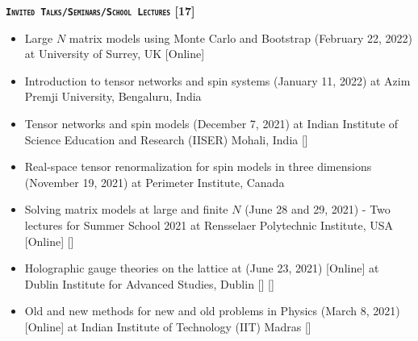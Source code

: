 \vspace{2mm} 
\textcolor{alizarin}{\textbf{\textsc{\fontsize{10}{38} \bfseries \texttt{Invited Talks/Seminars/School Lectures} [17]}}}

\begin{itemize}

\item Large $N$ matrix models using Monte Carlo and Bootstrap
 (February 22, 2022) at University of Surrey, UK [Online]  \vspace{1mm} 
 \item Introduction to tensor networks and spin systems 
 (January 11, 2022) at Azim Premji University, Bengaluru, India  \vspace{1mm} 
 \item Tensor networks and spin models 
 (December 7, 2021) at Indian Institute of Science Education and Research (IISER) Mohali, India 
 [\texttt{\textbf{}}]  \vspace{1mm} 
  \item Real-space tensor renormalization for spin models in three dimensions 
 (November 19, 2021) at Perimeter Institute, Canada \vspace{1mm}  
 \item Solving matrix models at large and finite $N$ (June 28 and 29, 2021) - Two lectures for 
Summer School 2021 at Rensselaer Polytechnic Institute, USA [Online]  
  [\texttt{\textbf{}}] \vspace{1mm} 
 
 
 \item Holographic gauge theories on the lattice at 
 (June 23, 2021) [Online] at Dublin Institute for Advanced Studies, Dublin
  [\texttt{\textbf{}}]  [\texttt{\textbf{}}] 
  \vspace{1mm} 
  
 \item Old and new methods for new and old problems in Physics
 (March 8, 2021) [Online] at Indian Institute of Technology (IIT) Madras
  [\texttt{\textbf{}}] 
\vspace{1mm} 
 

\end{itemize}
